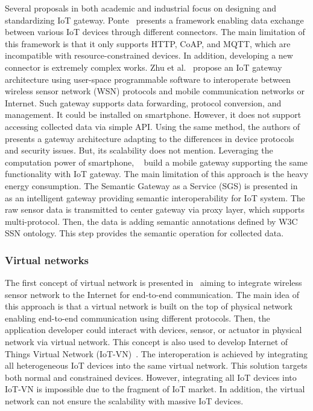 Several proposals in both academic and industrial focus on designing and standardizing IoT gateway. Ponte~\cite{PonteM2M76:online} presents a framework enabling data exchange between various IoT devices through different connectors. The main limitation of this framework is that it only supports HTTP, CoAP, and MQTT, which are incompatible with resource-constrained devices. In addition, developing a new connector is extremely complex works. Zhu et al.~\cite{zhu2010iot} propose an IoT gateway architecture using user-space programmable software to interoperate between wireless sensor network (WSN) protocols and mobile communication networks or Internet. Such gateway supports data forwarding, protocol conversion, and management. It could be installed on smartphone. However, it does not support accessing collected data via simple API. Using the same method, the authors of~\cite{fantacci2014short} presents a gateway architecture adapting to the differences in device protocols and security issues. But, its scalability does not mention. Leveraging the computation power of smartphone, ~\cite{pereira2016iot}\cite{aloi2017enabling} build a mobile gateway supporting the same functionality with IoT gateway. The main limitation of this approach is the heavy energy consumption. The Semantic Gateway as a Service (SGS) is presented in~\cite{asensio2014protocol} as an intelligent gateway providing semantic interoperability for IoT system. The raw sensor data is transmitted to center gateway via proxy layer, which supports multi-protocol. Then, the data is adding semantic annotations defined by W3C SSN ontology. This step provides the semantic operation for collected data. 

\subsubsection{Virtual networks}

The first concept of virtual network is presented in~\cite{hoebeke2011managed} aiming to integrate wireless sensor network to the Internet for end-to-end communication. The main idea of this approach is that a virtual network is built on the top of physical network enabling end-to-end communication using different protocols. Then, the application developer could interact with devices, sensor, or actuator in physical network via virtual network. This concept is also used to develop Internet of Things Virtual Network (IoT-VN)~\cite{ishaq2012internet}. The interoperation is achieved by integrating all heterogeneous IoT devices into the same virtual network. This solution targets both normal and constrained devices. However, integrating all IoT devices into IoT-VN is impossible due to the fragment of IoT market. In addition, the virtual network can not ensure the scalability with massive IoT devices. 

